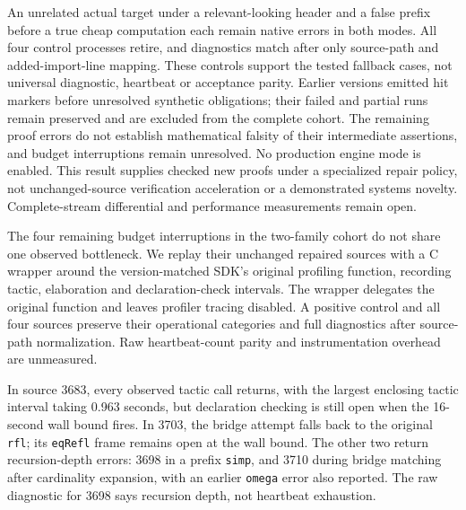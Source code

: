 \documentclass[10pt,twocolumn]{article}
\begin{document}
An unrelated actual target under a relevant-looking header and a false
prefix before a true cheap computation each remain native errors in both
modes. All four control processes retire, and diagnostics match after only
source-path and added-import-line mapping. These controls support the tested
fallback cases, not universal diagnostic, heartbeat or acceptance parity.
Earlier versions emitted hit markers before unresolved synthetic obligations;
their failed and partial runs remain preserved and are excluded from the
complete cohort. The remaining proof errors do not establish mathematical
falsity of their intermediate assertions, and budget interruptions remain
unresolved. No production engine mode is enabled. This result supplies checked
new proofs under a specialized repair policy, not unchanged-source
verification acceleration or a demonstrated systems novelty.
Complete-stream differential and performance measurements remain open.

The four remaining budget interruptions in the two-family cohort do not
share one observed bottleneck. We replay their unchanged repaired sources
with a C wrapper around the version-matched SDK's original profiling
function, recording tactic, elaboration and declaration-check intervals.
The wrapper delegates the original function and leaves profiler tracing
disabled. A positive control and all four sources preserve their operational
categories and full diagnostics after source-path normalization.
Raw heartbeat-count parity and instrumentation overhead are unmeasured.

In source 3683, every observed tactic call returns, with the largest enclosing
tactic interval taking 0.963 seconds, but declaration checking is still open
when the 16-second wall bound fires. In 3703, the bridge attempt falls back
to the original \texttt{rfl}; its \texttt{eqRefl} frame remains open at the
wall bound. The other two return recursion-depth errors: 3698 in a prefix
\texttt{simp}, and 3710 during bridge matching after cardinality expansion,
with an earlier \texttt{omega} error also reported. The raw diagnostic for
3698 says recursion depth, not heartbeat exhaustion.
\end{document}
